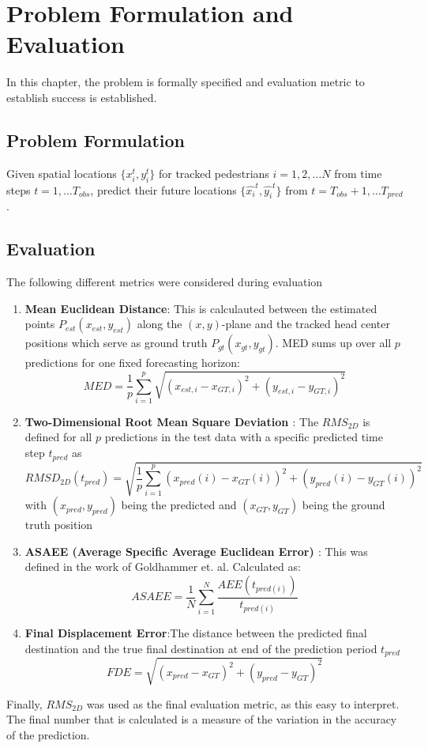\chapter{Problem Formulation and Evaluation}

In this chapter, the problem is formally specified and evaluation metric to establish success is established.

\section{Problem Formulation}
Given spatial locations \( \{x_i^t, y_i^t\} \) for tracked pedestrians \(i = 1, 2, \ldots N\) from time steps \(t = 1, \ldots T_{obs} \), predict their future locations \( \{\hat{x_i}^t, \hat{y_i}^t\} \) from \(t = T_{obs} + 1, \ldots T_{pred}\).

\section{Evaluation}
The following different metrics were considered during evaluation
\begin{enumerate}
    
    \item \textbf{Mean Euclidean Distance}\cite{goldhammer_pedestrians_2014}:
    This is calculauted between the estimated points \( P_{est}(x_{est},y_{est})\) along the \((x,y)\)-plane and the tracked head center positions which serve as ground truth \(P_{gt}(x_{gt}, y_{gt})\). MED sums up over all \(p\) predictions for one fixed forecasting horizon:
    \[ MED = \frac{1}{p} \sum_{i=1}^{p} \sqrt{(x_{est,i}-x_{GT,i})^2 + (y_{est,i}-y_{GT,i})^2} \]
    
    \item \textbf{Two-Dimensional Root Mean Square Deviation
    \cite{goldhammer_camera_2015}}:
    The \(RMS_{2D}\) is defined for all \(p\) predictions in the test data with a specific predicted time step \(t_{pred} \) as
    \[ RMSD_{2D}(t_{pred}) = \sqrt{\frac{1}{p}\sum_{i=1}^{p}(x_{pred}(i)-x_{GT}(i))^2+(y_{pred}(i)-y_{GT}(i))^2}\]
    with \((x_{pred},y_{pred})\) being the predicted and \((x_{GT},y_{GT})\) being the ground truth position
    
    
    \item \textbf{ASAEE (Average Specific Average Euclidean Error) \cite{goldhammer_intentions_2018}}: This was defined in the work of Goldhammer et. al\cite{goldhammer_intentions_2018}. Calculated as:
    \[ ASAEE = \frac{1}{N} \sum_{i=1}^{N} \frac{AEE(t_{pred(i)})}{t_{pred(i)}}  \]
    
    \item \textbf{Final Displacement Error\cite{alahi_social_2016}}:The distance between the predicted final destination and the true final destination at end of the prediction period \(t_{pred}\)
    \[FDE =  \sqrt{(x_{pred}-x_{GT})^2 + (y_{pred}-y_{GT})^2}
\]
\end{enumerate}


Finally, \(RMS_{2D}\) was used as the final evaluation metric, as this easy to interpret. The final number that is calculated is a measure of the variation in the accuracy of the prediction.
